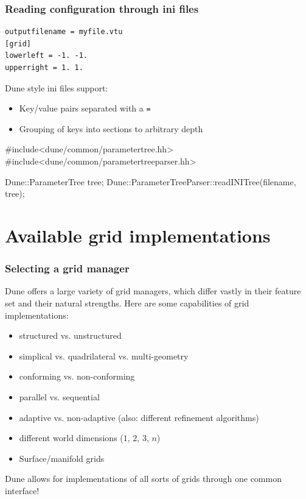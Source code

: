 \documentclass[aspectratio=169,11pt]{beamer}
\theoremstyle{definition}
\begin{document}
\begin{frame}[fragile]
 \frametitle{Reading configuration through ini files}
\begin{lstlisting}
outputfilename = myfile.vtu
[grid]
lowerleft = -1. -1.
upperright = 1. 1.
\end{lstlisting}
\vspace{0.5cm}
 Dune style ini files support:
 \begin{itemize}
  \item Key/value pairs separated with a \verb!=!
  \item Grouping of keys into sections to arbitrary depth
 \end{itemize}

 \begin{cppcode}
  #include<dune/common/parametertree.hh>
  #include<dune/common/parametertreeparser.hh>

  Dune::ParameterTree tree;
  Dune::ParameterTreeParser::readINITree(filename, tree);
 \end{cppcode}

\end{frame}

\section{Available grid implementations}

\begin{frame}
 \frametitle{Selecting a grid manager}

 Dune offers a large variety of grid managers, which differ vastly in their feature set and their natural strengths.
 Here are some capabilities of grid implementations:
 \begin{itemize}
  \item structured vs. unstructured
  \item simplical vs. quadrilateral vs. multi-geometry
  \item conforming vs. non-conforming
  \item parallel vs. sequential
  \item adaptive vs. non-adaptive (also: different refinement algorithms)
  \item different world dimensions ($1$, $2$, $3$, $n$)
  \item Surface/manifold grids
 \end{itemize}

 Dune allows for implementations of all sorts of grids through one common interface!
\end{frame}
\end{document}
